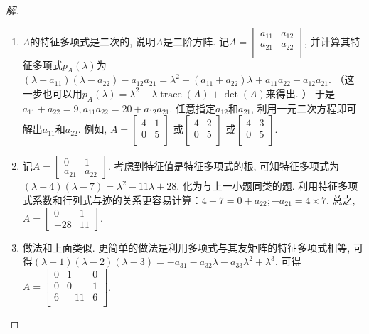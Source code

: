 \documentclass{ctexart}
\DeclareMathOperator{\trace}{trace}
\begin{document}
\begin{proof}[解]
	\begin{enumerate}
		\item $A$的特征多项式是二次的, 说明$A$是二阶方阵. 记$A=\begin{bmatrix}
				a_{11} & a_{12}\\ a_{21} & a_{22}\\
			\end{bmatrix}$, 并计算其特征多项式$p_A(\lambda)$为$(\lambda-a_{11})(\lambda-a_{22})-a_{12}a_{21}=\lambda^2-(a_{11}+a_{22})\lambda+a_{11}a_{22}-a_{12}a_{21}$. （这一步也可以用$p_A(\lambda)=\lambda^2-\lambda\trace(A)+\det(A)$来得出. ）
			于是$a_{11}+a_{22}=9,a_{11}a_{22}=20+a_{12}a_{21}$. 任意指定$a_{12}$和$a_{21}$, 利用一元二次方程即可解出$a_{11}$和$a_{22}$. 
			例如, $A=\begin{bmatrix}
				4 & 1 \\ 0 & 5\\
			\end{bmatrix}$ 或$\begin{bmatrix}
				4 & 2 \\ 0 & 5\\
			\end{bmatrix}$ 或$\begin{bmatrix}
				4 & 3 \\ 0 & 5\\
			\end{bmatrix}$. 
			\item 记$A=\begin{bmatrix}
					0 & 1 \\ a_{21} & a_{22}
				\end{bmatrix}$. 考虑到特征值是特征多项式的根, 可知特征多项式为$(\lambda-4)(\lambda-7)=\lambda^2-11\lambda+28$. 化为与上一小题同类的题. 
				利用特征多项式系数和行列式与迹的关系更容易计算：$4+7=0+a_{22}; -a_{21}=4\times 7$. 
				总之, $A=\begin{bmatrix}
					0 & 1 \\ -28 & 11
				\end{bmatrix}$. 
				　\item 做法和上面类似. 更简单的做法是利用多项式与其友矩阵的特征多项式相等, 可得$(\lambda-1)(\lambda-2)(\lambda-3)=-a_{31}-a_{32}\lambda-a_{33}\lambda^2+\lambda^3$. 
			可得$A=\begin{bmatrix}
				0& 1& 0\\ 0&0& 1\\ 6 & -11  & 6\\
			\end{bmatrix}$. 
	\end{enumerate}
\end{proof}
\end{document}
